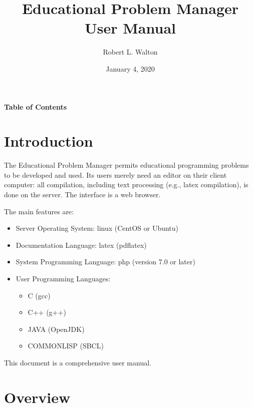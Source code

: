 \documentclass[12pt]{article}
\makeatletter
\renewcommand\tableofcontents{%
    \begin{list}{}%
	     {\setlength{\itemsep}{0in}%
	      \setlength{\topsep}{0in}%
	      \setlength{\parsep}{1ex}%
	      \setlength{\labelwidth}{0in}%
	      \setlength{\baselineskip}{1.5ex}%
	      \setlength{\leftmargin}{0.8in}%
	      \setlength{\rightmargin}{0.8in}}%
    \item\@starttoc{toc}%
    \end{list}}
\makeatother
\begin{document}
        
\title{Educational Problem Manager\\User Manual}

\author{Robert L. Walton}

\date{January 4, 2020}
 
\maketitle

\begin{center}
\large \bf Table of Contents
\end{center}

\bigskip

\tableofcontents 

\newpage

\section{Introduction}

The Educational Problem Manager permits educational programming
problems to be developed and used.  Its users merely need an
editor on their client computer: all compilation, including
text processing (e.g., latex compilation), is done on the
server.  The interface is a web browser.

The main features are:

\begin{itemize}
\item Server Operating System: linux (CentOS or Ubuntu)
\item Documentation Language: latex (pdflatex)
\item System Programming Language: php (version 7.0 or later)
\item User Programming Languages:
\begin{itemize}
\item C (gcc)
\item C++ (g++)
\item JAVA (OpenJDK)
\item COMMONLISP (SBCL)
\end{itemize}

\end{itemize}

This document is a comprehensive user manual.

\section{Overview}
\end{document}
